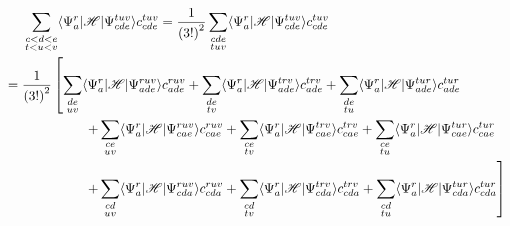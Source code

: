 \documentclass[a4paper]{book}
\begin{document}
	\begin{solution}
	
	\begin{align}
		&\hspace{1.4em}\sum_{ \substack{ c<d<e \\ t<u<v} } \langle \Psi^r_a | \mathscr{H} | \Psi^{tuv}_{cde} \rangle c^{tuv}_{cde} = \frac{1}{\left(3!\right)^2} \sum_{ \substack{ cde \\ tuv} } \langle \Psi^r_a | \mathscr{H} | \Psi^{tuv}_{cde} \rangle c^{tuv}_{cde} \notag \\
		&= \frac{1}{\left(3!\right)^2}  \left[ \sum_{ \substack{ de \\ uv } } \langle \Psi^r_a | \mathscr{H} | \Psi^{ruv}_{ade} \rangle c^{ruv}_{ade} + \sum_{ \substack{ de \\ tv } } \langle \Psi^r_a | \mathscr{H} | \Psi^{trv}_{ade} \rangle c^{trv}_{ade} + \sum_{ \substack{ de \\ tu } } \langle \Psi^r_a | \mathscr{H} | \Psi^{tur}_{ade} \rangle c^{tur}_{ade} \right. \notag \\
		&\hspace{ 6em } \left. + \sum_{ \substack{ ce \\ uv } } \langle \Psi^r_a | \mathscr{H} | \Psi^{ruv}_{cae} \rangle c^{ruv}_{cae} + \sum_{ \substack{ ce \\ tv } } \langle \Psi^r_a | \mathscr{H} | \Psi^{trv}_{cae} \rangle c^{trv}_{cae} + \sum_{ \substack{ ce \\ tu } } \langle \Psi^r_a | \mathscr{H} | \Psi^{tur}_{cae} \rangle c^{tur}_{cae} \right. \notag \\
		&\hspace{ 6em } \left. + \sum_{ \substack{ cd \\ uv } } \langle \Psi^r_a | \mathscr{H} | \Psi^{ruv}_{cda} \rangle c^{ruv}_{cda} + \sum_{ \substack{ cd \\ tv } } \langle \Psi^r_a | \mathscr{H} | \Psi^{trv}_{cda} \rangle c^{trv}_{cda} + \sum_{ \substack{ cd \\ tu } } \langle \Psi^r_a | \mathscr{H} | \Psi^{tur}_{cda} \rangle c^{tur}_{cda} \right] \notag \\

\end{align}
\end{solution}
\end{document}
